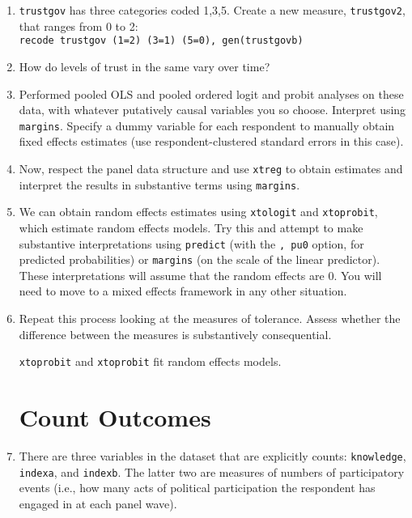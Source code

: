 \documentclass[a4paper,12pt]{article}
\begin{document}
\begin{enumerate}
\item \texttt{trustgov} has three categories coded 1,3,5. Create a new measure, \texttt{trustgov2}, that ranges from 0 to 2:\\
\texttt{recode trustgov (1=2) (3=1) (5=0), gen(trustgovb)}

\item How do levels of trust in the same vary over time?

\item Performed pooled OLS and pooled ordered logit and probit analyses on these data, with whatever putatively causal variables you so choose. Interpret using \texttt{margins}. Specify a dummy variable for each respondent to manually obtain fixed effects estimates (use respondent-clustered standard errors in this case).

\item Now, respect the panel data structure and use \texttt{xtreg} to obtain estimates and interpret the results in substantive terms using \texttt{margins}.

\item We can obtain random effects estimates using \texttt{xtologit} and \texttt{xtoprobit}, which estimate random effects models. Try this and attempt to make substantive interpretations using \texttt{predict} (with the \texttt{, pu0} option, for predicted probabilities) or \texttt{margins} (on the scale of the linear predictor). These interpretations will assume that the random effects are 0. You will need to move to a mixed effects framework in any other situation.

\item Repeat this process looking at the measures of tolerance. Assess whether the difference between the measures is substantively consequential.



\texttt{xtoprobit} and \texttt{xtoprobit} fit random effects models.

\section{Count Outcomes}

\item There are three variables in the dataset that are explicitly counts: \texttt{knowledge}, \texttt{indexa}, and \texttt{indexb}. The latter two are measures of numbers of participatory events (i.e., how many acts of political participation the respondent has engaged in at each panel wave).


\end{enumerate}
\end{document}
